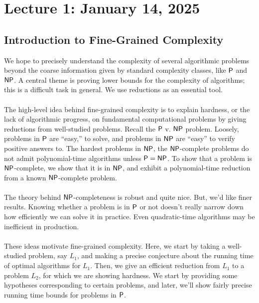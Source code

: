 \section{Lecture 1: January 14, 2025}

    \subsection{Introduction to Fine-Grained Complexity}
    
        We hope to precisely understand the complexity of several algorithmic problems beyond the coarse information given by standard complexity classes, like \(\mathsf{P}\) and \(\mathsf{NP}\). A central theme is proving lower bounds for the complexity of algorithms; this is a difficult task in general. We use reductions as an essential tool.
        \\
        \\
        The high-level idea behind fine-grained complexity is to explain hardness, or the lack of algorithmic progress, on fundamental computational problems by giving reductions from well-studied problems. Recall the \(\mathsf{P}\) v. \(\mathsf{NP}\) problem. Loosely, problems in \(\mathsf{P}\) are ``easy,'' to solve, and problems in \(\mathsf{NP}\) are ``easy'' to verify positive answers to. The hardest problems in \(\mathsf{NP}\), the \(\mathsf{NP}\)-complete problems do not admit polynomial-time algorithms unless \(\mathsf{P}=\mathsf{NP}\). To show that a problem is \(\mathsf{NP}\)-complete, we show that it is in \(\mathsf{NP}\), and exhibit a polynomial-time reduction from a known \(\mathsf{NP}\)-complete problem. 
        \\
        \\
        The theory behind \(\mathsf{NP}\)-completeness is robust and quite nice. But, we'd like finer results. Knowing whether a problem is in \(\mathsf{P}\) or not doesn't really narrow down how efficiently we can solve it in practice. Even quadratic-time algorithms may be inefficient in production.
        \\
        \\
        These ideas motivate fine-grained complexity. Here, we start by taking a well-studied problem, say \(L_1\), and making a precise conjecture about the running time of optimal algorithms for \(L_1\). Then, we give an efficient reduction from \(L_1\) to a problem \(L_2\), for which we are showing hardness. We start by providing some hypotheses corresponding to certain problems, and later, we'll show fairly precise running time bounds for problems in \(\mathsf{P}\).
